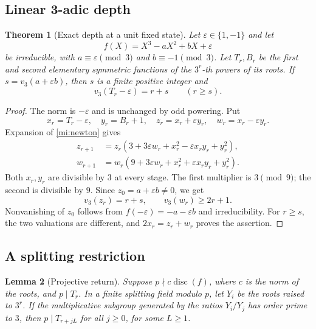 \documentclass[11pt,a4paper]{article}
\numberwithin{equation}{section}
\newtheorem{theorem}{Theorem}[section]
\newtheorem{lemma}[theorem]{Lemma}
\theoremstyle{definition}
\theoremstyle{remark}
\begin{document}
\subsection{Linear 3-adic depth}

\begin{theorem}[Exact depth at a unit fixed state]
\label{mi:depth}
Let \(\varepsilon\in\{1,-1\}\) and let
\[
 f(X)=X^3-aX^2+bX+\varepsilon
\]
be irreducible, with
\(a\equiv\varepsilon\pmod3\) and \(b\equiv-1\pmod3\).
Let \(T_r,B_r\) be the first and second elementary symmetric
functions of the \(3^r\)-th powers of its roots.
If \(s=v_3(a+\varepsilon b)\), then \(s\) is a finite positive
integer and
\[
 v_3(T_r-\varepsilon)=r+s\qquad(r\ge s).
\]
\end{theorem}

\begin{proof}
The norm is \(-\varepsilon\) and is unchanged by odd powering.
Put
\[
 x_r=T_r-\varepsilon,\quad y_r=B_r+1,\quad
 z_r=x_r+\varepsilon y_r,\quad w_r=x_r-\varepsilon y_r.
\]
Expansion of \eqref{mi:newton} gives
\begin{align*}
 z_{r+1}
 &=z_r(3+3\varepsilon w_r+x_r^2-\varepsilon x_ry_r+y_r^2),\\
 w_{r+1}
 &=w_r(9+3\varepsilon w_r+x_r^2+\varepsilon x_ry_r+y_r^2).
\end{align*}
Both \(x_r,y_r\) are divisible by \(3\) at every stage.
The first multiplier is \(3\pmod9\); the second is divisible by
\(9\). Since \(z_0=a+\varepsilon b\ne0\), we get
\[
 v_3(z_r)=r+s,\qquad v_3(w_r)\ge2r+1.
\]
Nonvanishing of \(z_0\) follows from
\(f(-\varepsilon)=-a-\varepsilon b\) and irreducibility.
For \(r\ge s\), the two valuations are different, and
\(2x_r=z_r+w_r\) proves the assertion.
\end{proof}

\subsection{A splitting restriction}

\begin{lemma}[Projective return]
\label{mi:return}
Suppose \(p\nmid c\operatorname{disc}(f)\), where \(c\) is the
norm of the roots, and \(p\mid T_r\).
In a finite splitting field modulo \(p\), let \(Y_i\) be the
roots raised to \(3^r\). If the multiplicative subgroup
generated by the ratios \(Y_i/Y_j\) has order prime to \(3\),
then \(p\mid T_{r+jL}\) for all \(j\ge0\), for some \(L\ge1\).
\end{lemma}
\end{document}

